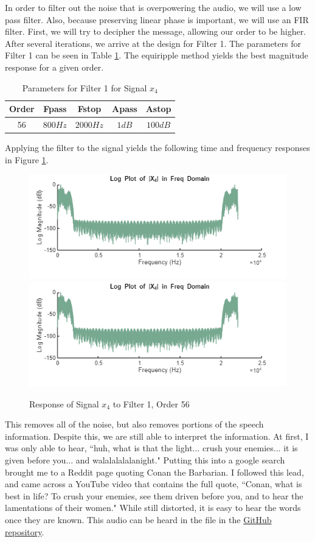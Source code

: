 In order to filter out the noise that is overpowering the audio, we will use a low pass filter.  Also, because preserving linear phase is important, we will use an FIR filter.  First, we will try to decipher the message, allowing our order to be higher.  After several iterations, we arrive at the design for Filter 1.  The parameters for Filter 1 can be seen in Table \ref{tab:x4_v22}.  The equiripple method yields the best magnitude response for a given order.

\begin{table}[H]
    \centering
    \begin{tabular}{c|cccc}
         Order & Fpass & Fstop & Apass & Astop \\ \hline
         56 & $800  \unit{Hz}$ & $2000  \unit{Hz}$ & $1  \unit{dB} $ & $100  \unit{dB}$
    \end{tabular}
    \caption{Parameters for Filter 1 for Signal $x_4$}
    \label{tab:x4_v22}
\end{table}

Applying the filter to the signal yields the following time and frequency responses in Figure \ref{fig:x4_v22_both}.


\begin{figure}
    \centering
    \includegraphics[width=0.5\linewidth]{figures/x4_v22.png}
    \includegraphics[width=0.5\linewidth]{figures/X4_v22.png}
    \caption{Response of Signal $x_4$ to Filter 1, Order 56}
    \label{fig:x4_v22_both}
\end{figure}

This removes all of the noise, but also removes portions of the speech information.  Despite this, we are still able to interpret the information.  At first, I was only able to hear, ``huh, what is that the light... crush your enemies... it is given before you... and walalalalalanight." Putting this into a google search brought me to a Reddit page quoting Conan the Barbarian.  I followed this lead, and came across a YouTube video that contains the full quote, ``Conan, what is best in life? To crush your enemies, see them driven before you, and to hear the lamentations of their women."  While still distorted, it is easy to hear the words once they are known.  This audio can be heard in the  file in the \href{https://github.com/dbcometto/ece434_cpx2}{GitHub repository}.

